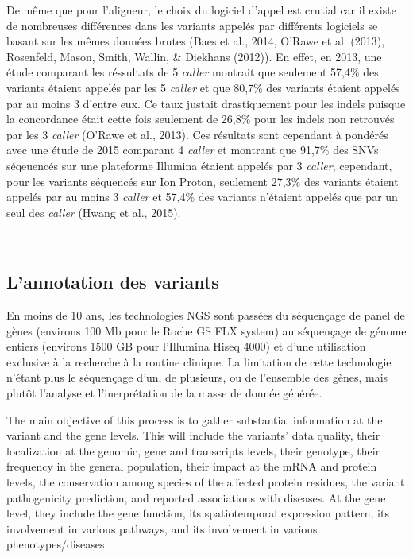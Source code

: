 \documentclass[12pt,twoside]{reedthesis}
\theoremstyle{definition}
\theoremstyle{definition}
\theoremstyle{remark}
\begin{document}
  De même que pour l'aligneur, le choix du logiciel d'appel est crutial
  car il existe de nombreuses différences dans les variants appelés par
  différents logiciels se basant sur les mêmes données brutes (Baes et
  al., 2014, O'Rawe et al. (2013), Rosenfeld, Mason, Smith, Wallin, \&
  Diekhans (2012)). En effet, en 2013, une étude comparant les réssultats
  de 5 \emph{caller} montrait que seulement 57,4\% des variants étaient
  appelés par les 5 \emph{caller} et que 80,7\% des variants étaient
  appelés par au moins 3 d'entre eux. Ce taux justait drastiquement pour
  les indels puisque la concordance était cette fois seulement de 26,8\%
  pour les indels non retrouvés par les 3 \emph{caller} (O'Rawe et al.,
  2013). Ces résultats sont cependant à pondérés avec une étude de 2015
  comparant 4 \emph{caller} et montrant que 91,7\% des SNVs séqeuencés sur
  une plateforme Illumina étaient appelés par 3 \emph{caller}, cependant,
  pour les variants séquencés sur Ion Proton, seulement 27,3\% des
  variants étaient appelés par au moins 3 \emph{caller} et 57,4\% des
  variants n'étaient appelés que par un seul des \emph{caller} (Hwang et
  al., 2015).
  
  \\
  
  \subsection{L'annotation des variants}\label{lannotation-des-variants}
  
  En moins de 10 ans, les technologies NGS sont passées du séquençage de
  panel de gènes (environs 100 Mb pour le Roche GS FLX system) au
  séquençage de génome entiers (environs 1500 GB pour l'Illumina Hiseq
  4000) et d'une utilisation exclusive à la recherche à la routine
  clinique. La limitation de cette technologie n'étant plus le séquençage
  d'un, de plusieurs, ou de l'ensemble des gènes, mais plutôt l'analyse et
  l'inerprétation de la masse de donnée générée.
  
  The main objective of this process is to gather substantial information
  at the variant and the gene levels. This will include the variants' data
  quality, their localization at the genomic, gene and transcripts levels,
  their genotype, their frequency in the general population, their impact
  at the mRNA and protein levels, the conservation among species of the
  affected protein residues, the variant pathogenicity prediction, and
  reported associations with diseases. At the gene level, they include the
  gene function, its spatiotemporal expression pattern, its involvement in
  various pathways, and its involvement in various phenotypes/diseases.
  
\end{document}
